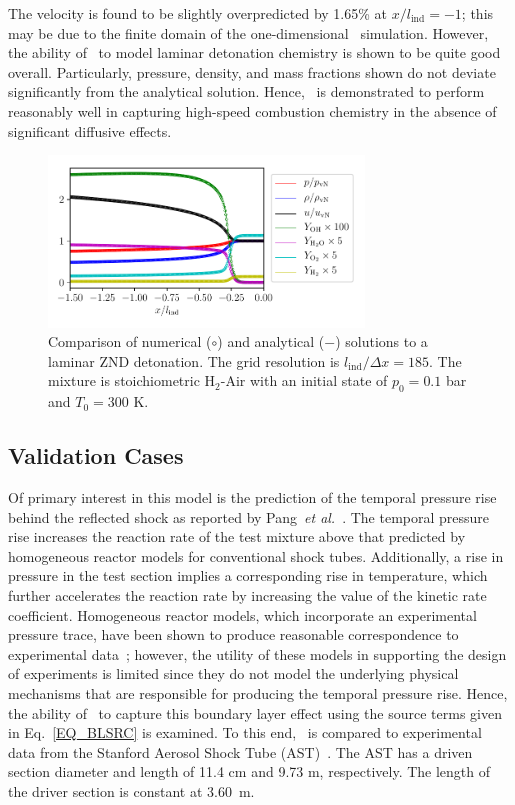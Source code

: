  The velocity is found to be slightly overpredicted by 1.65\% at $x/l_\mathrm{ind}=-1$; this may be due to the finite domain of the one-dimensional \stnshk\ simulation. However, the ability of \stnshk\ to model laminar detonation chemistry is shown to be quite good overall. Particularly, pressure, density, and mass fractions shown do not deviate significantly from the analytical solution. Hence, \stnshk\ is demonstrated to perform reasonably well in capturing high-speed combustion chemistry in the absence of significant diffusive effects.

\begin{figure}[!ht!]
	\centering
	\includegraphics[width=84mm]{ZNDDetonation}
	\caption{\label{FIG_ZND} Comparison of numerical ($\circ$) and analytical ($-$) solutions to a laminar ZND detonation. The grid resolution is $l_\mathrm{ind}/\Delta x=185$. The mixture is stoichiometric H$_2$-Air with an initial state of $p_0=0.1$ bar and $T_0=300$ K.} 
\end{figure}

\subsection{Validation Cases}

Of primary interest in this model is the prediction of the temporal pressure rise behind the reflected shock as reported by Pang~\emph{et al.}~\cite{PANG_DAVIDSON_HANSON_PCI32}. The temporal pressure rise increases the reaction rate of the test mixture above that predicted by homogeneous reactor models for conventional shock tubes. Additionally, a rise in pressure in the test section implies a corresponding rise in temperature, which further accelerates the reaction rate by increasing the value of the kinetic rate coefficient. Homogeneous reactor models, which incorporate an experimental pressure trace, have been shown to produce reasonable correspondence to experimental data~\cite{PANG_DAVIDSON_HANSON_PCI32}; however, the utility of these models in supporting the design of experiments is limited since they do not model the underlying physical mechanisms that are responsible for producing the temporal pressure rise. Hence, the ability of \stnshk\ to capture this boundary layer effect using the source terms given in Eq.~\ref{EQ_BLSRC} is examined. To this end, \stnshk\ is compared to experimental data from the Stanford Aerosol Shock Tube (AST)~\cite{CAMPBELL_THESIS}. The AST  has a driven section diameter and length of 11.4 cm and 9.73 m, respectively. The length of the driver section is constant at 3.60~m. 

